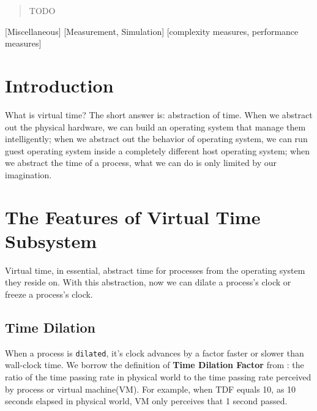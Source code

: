 \documentclass{acm_proc_article-sp}
\begin{document}
\date{30 July 1999}

\maketitle

\begin{abstract}
TODO
\end{abstract}

[Miscellaneous]
[Measurement, Simulation]
[complexity measures, performance measures]



\section{Introduction}
What is virtual time? The short answer is: abstraction of time. When we abstract out the physical hardware, we can build an operating system that manage them intelligently; when we abstract out the behavior of operating system, we can run guest operating system inside a completely different host operating system; when we abstract the time of a process, what we can do is only limited by our imagination.

\section{The Features of Virtual Time Subsystem}
Virtual time, in essential, abstract time for processes from the operating system they reside on. With this abstraction, now we can dilate a process's clock or freeze a process's clock.

\subsection{Time Dilation}
When a process is \texttt{dilated}, it's clock advances by a factor faster or slower than wall-clock time. We borrow the definition of \textbf{Time Dilation Factor} from \cite{toinfinitybeyond}: the ratio of the time passing rate in physical world to the time passing rate perceived by process or virtual machine(VM). For example, when TDF equals 10, as 10 seconds elapsed in physical world, VM only perceives that 1 second passed. 
\end{document}
